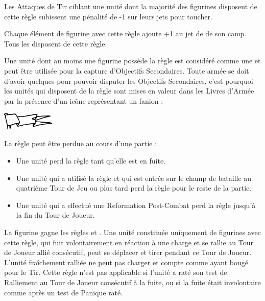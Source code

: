 
Les Attaques de Tir ciblant une unité dont la majorité des figurines disposent de cette règle subissent une pénalité de -1 sur leurs jets pour toucher.

\label{channel_special_rule}

Chaque élément de figurine avec cette règle ajoute +1 au jet de \channel{} de son camp. Tous les \wizards{} disposent de cette règle.


Une unité dont au moins une figurine possède la règle \scoring{} est considéré comme une \scoringunit{} et peut être utilisée pour la capture d'Objectifs Secondaires. Toute armée se doit d'avoir quelques \scoringunits{} pour pouvoir disputer les Objectifs Secondaires, c'est pourquoi les unités qui disposent de la règle \scoring{} sont mises en valeur dans les Livres d'Armée par la présence d'un icône représentant un fanion :

\begin{center}
\includegraphics[width=2.5cm]{../Layout/pics/logo_scoring.png}
\end{center}

La règle \scoring{} peut être perdue au cours d'une partie :
\begin{itemize}[label={-}]
\item Une unité perd la règle \scoring{} tant qu'elle est en fuite.
\item Une unité qui a utilisé la règle \ambush{} et qui est entrée sur le champ de bataille au quatrième Tour de Jeu ou plus tard perd la règle \scoring{} pour le reste de la partie.
\item Une unité qui a effectué une Reformation Post-Combat perd la règle \scoring{} jusqu'à la fin du Tour de Joueur.
\end{itemize}


La figurine gagne les règles \vanguard{} et \lighttroops{}. Une unité constituée uniquement de figurines avec cette règle, qui fuit volontairement en réaction à une charge et se rallie au Tour de Joueur allié consécutif, peut se déplacer et tirer pendant ce Tour de Joueur. L'unité fraîchement ralliée ne peut pas charger et compte comme ayant bougé pour le Tir. Cette règle n'est pas applicable si l'unité a raté son test de Ralliement au Tour de Joueur consécutif à la fuite, ou si la fuite était involontaire comme après un test de Panique raté.

